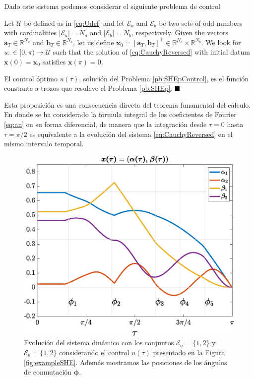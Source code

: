 %
Dado este sistema podemos considerar el siguiente problema de control
\vspace{1em}
\begin{problem}\label{pb:SHEpControl}
    Let $\mathcal{U}$ be defined as in \eqref{eq:Udef} and let $\mathcal{E} _a $ and $\mathcal{E} _b $ be two sets of odd numbers with cardinalities $|\mathcal{E}_a| = N_a $ and $ |\mathcal{E} _b| = N_b$, respectively. Given the vectors $\bm{a}_T \in \mathbb{R}^{N_a}$ and $\bm{b}_T \in \mathbb{R}^{N_b} $, let us define $\bm{x}_0=[\bm{a}_T,\bm{b}_T]^\top \in \mathbb{R}^{N_a}\times\mathbb{R}^{N_b}$. We look for $u:\in [0,\pi)\to\mathcal{U}$ such that the solution of \eqref{eq:CauchyReversed} with initial datum $\bm{x}(0)=\bm{x}_0$ satisfies $\bm{x}(\pi)=0$.
\end{problem}
\vspace{1em}

\begin{theorem}\label{th:SHEasDyn}
    El control óptimo $u(\tau)$, solución del Problema \ref{pb:SHEpControl}, es el función constante a trozos que resuleve el Problema \ref{pb:SHEp}.   
    $\hfill \blacksquare$
\end{theorem}

Esta proposición es una consecuencia directa del teorema funamental del cálculo. En donde se ha considerado la formula integral de los coeficientes de Fourier \eqref{eq:an} en su forma diferencial, de manera que la integración desde $\tau = 0 $ hasta $\tau = \pi/2$ es equivalente a la evolución del sistema \eqref{eq:CauchyReversed} en el mismo intervalo temporal.

\begin{figure}[ht!] 
    \centering
    \includegraphics[scale=0.325]{img/fig02.eps}
    \caption{Evolución del sistema dinámico con los conjuntos $\mathcal{E}_a = \{1,2\}$ y $\mathcal{E}_b = \{1,2\}$ considerando el control $u(\tau)$ presentado en la Figura \ref{fig:exampleSHE}. Además mostramos las posiciones de los ángulos de conmutación $\bm{\phi}$.}
\end{figure}

